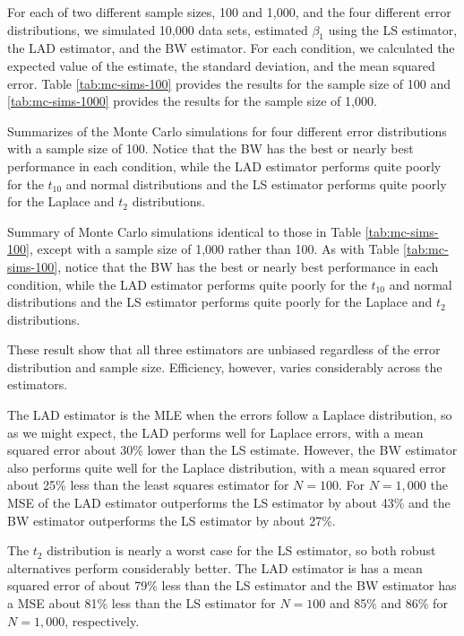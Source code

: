 \documentclass[12pt]{article}
\begin{document}
For each of two different sample sizes, 100 and 1,000, and the four different error distributions, we simulated 10,000 data sets, estimated $\beta_1$ using the LS estimator, the LAD estimator, and the BW estimator. For each condition, we calculated the expected value of the estimate, the standard deviation, and the mean squared error. Table \ref{tab:mc-sims-100} provides the results for the sample size of 100 and \ref{tab:mc-sims-1000} provides the results for the sample size of 1,000. 

\begin{table}[H]
{\tiny

}
\caption{Summarizes of the Monte Carlo simulations for four different error distributions with a sample size of 100. Notice that the BW has the best or nearly best performance in each condition, while the LAD estimator performs quite poorly for the $t_{10}$ and normal distributions and the LS estimator performs quite poorly for the Laplace and $t_2$ distributions.}\label{tab:mc-sims-100}
\end{table}

\begin{table}[H]
{\tiny

}
\caption{Summary of Monte Carlo simulations identical to those in Table \ref{tab:mc-sims-100}, except with a sample size of 1,000 rather than 100. As with Table \ref{tab:mc-sims-100}, notice that the BW has the best or nearly best performance in each condition, while the LAD estimator performs quite poorly for the $t_{10}$ and normal distributions and the LS estimator performs quite poorly for the Laplace and $t_2$ distributions.}\label{tab:mc-sims-1000}
\end{table}

These result show that all three estimators are unbiased regardless of the error distribution and sample size. Efficiency, however, varies considerably across the estimators.

The LAD estimator is the MLE when the errors follow a Laplace distribution, so as we might expect, the LAD performs well for Laplace errors, with a mean squared error about 30\% lower than the LS estimate. However, the BW estimator also performs quite well for the Laplace distribution, with a mean squared error about 25\% less than the least squares estimator for $N = 100$. For $N = 1,000$ the MSE of the LAD estimator outperforms the LS estimator by about 43\% and the BW estimator outperforms the LS estimator by about 27\%.

The $t_2$ distribution is nearly a worst case for the LS estimator, so both robust alternatives perform considerably better. The LAD estimator is has a mean squared error of about 79\% less than the LS estimator and the BW estimator has a MSE about 81\% less than the LS estimator for $N = 100$ and 85\% and 86\% for $N = 1,000$, respectively. 
\end{document}
